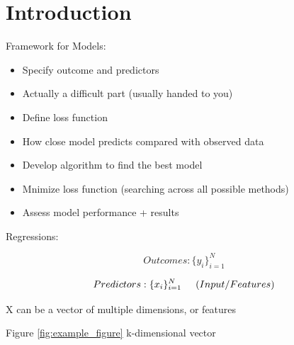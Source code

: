 
\section{Introduction}
Framework for Models:
\begin{itemize}
  \item Specify outcome and predictors
  \item Actually a difficult part (usually handed to you)
  \item Define loss function
  \item How close model predicts compared with observed data
  \item Develop algorithm to find the best model
  \item Mnimize loss function (searching across all possible methods)
  \item Assess model performance + results
\end{itemize}

\vspace{10mm}

Regressions:

\begin{equation}
Outcomes: \lbrace {y_i} \rbrace^N_{i=1}
\end{equation}

\begin{equation}
Predictors: \lbrace {x_i} \rbrace^N_{i=1} \hspace{5mm}  (Input/Features)
\end{equation}

\vspace{5mm}
X can be a vector of multiple dimensions, or features

\pagebreak

Figure \ref{fig:example_figure} k-dimensional vector

